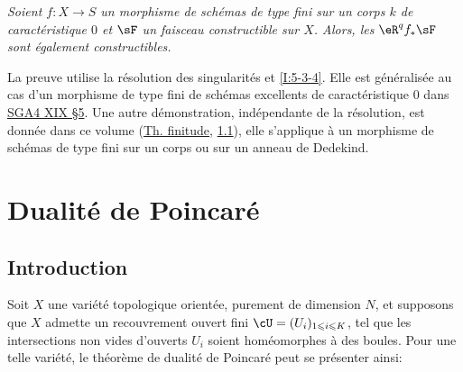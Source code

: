 \begingroup
\renewcommand*{\thesubsubsection}{3.5.2}
\begin{sourceinline}\label{I:5-3-7} %
\itshape
Soient $f:X\to S$ un morphisme de schémas de type fini sur un corps $k$ de 
caractéristique $0$ et $\sF$ un faisceau constructible sur $X$. Alors, les 
$\eR^q f_* \sF$ sont également constructibles.
\end{sourceinline}
\endgroup

La preuve utilise la résolution des singularités et \ref{I:5-3-4}. Elle est 
généralisée au cas d'un morphisme de type fini de schémas excellents de 
caractéristique $0$ dans \hyperlink{cite.sga4}{SGA4 XIX \S5}. Une autre démonstration, 
indépendante de la résolution, est donnée dans ce volume 
(\hyperref[VII]{Th. finitude}, \hyperref[VII:1-1]{1.1}),
elle s'applique à un morphisme de schémas de type fini sur un corps ou sur 
un anneau de Dedekind. 




















\section{Dualité de Poincaré}\label{I:6}










\subsection{Introduction}\label{I:6-1}

Soit $X$ une variété topologique orientée, purement de dimension $N$, et 
supposons que $X$ admette un recouvrement ouvert fini 
$\cU=(U_i)_{1\leqslant i\leqslant K}$, tel que les intersections non vides 
d'ouverts $U_i$ soient homéomorphes à des boules. Pour une telle variété, 
le théorème de dualité de Poincaré peut se présenter ainsi: 

